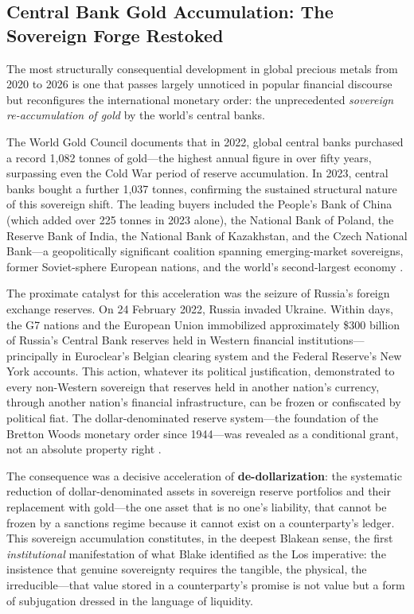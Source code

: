 \documentclass[
]{article}
\begin{document}
\subsection{Central Bank Gold Accumulation: The Sovereign Forge
Restoked}\label{central-bank-gold-accumulation-the-sovereign-forge-restoked}

The most structurally consequential development in global precious
metals from 2020 to 2026 is one that passes largely unnoticed in popular
financial discourse but reconfigures the international monetary order:
the unprecedented \emph{sovereign re-accumulation of gold} by the
world's central banks.

The World Gold Council documents that in 2022, global central banks
purchased a record 1,082 tonnes of gold---the highest annual figure in
over fifty years, surpassing even the Cold War period of reserve
accumulation. In 2023, central banks bought a further 1,037 tonnes,
confirming the sustained structural nature of this sovereign shift. The
leading buyers included the People's Bank of China (which added over 225
tonnes in 2023 alone), the National Bank of Poland, the Reserve Bank of
India, the National Bank of Kazakhstan, and the Czech National Bank---a
geopolitically significant coalition spanning emerging-market
sovereigns, former Soviet-sphere European nations, and the world's
second-largest economy \citep{worldgoldcouncil2024demand}.

The proximate catalyst for this acceleration was the seizure of Russia's
foreign exchange reserves. On 24 February 2022, Russia invaded Ukraine.
Within days, the G7 nations and the European Union immobilized
approximately \$300 billion of Russia's Central Bank reserves held in
Western financial institutions---principally in Euroclear's Belgian
clearing system and the Federal Reserve's New York accounts. This
action, whatever its political justification, demonstrated to every
non-Western sovereign that reserves held in another nation's currency,
through another nation's financial infrastructure, can be frozen or
confiscated by political fiat. The dollar-denominated reserve
system---the foundation of the Bretton Woods monetary order since
1944---was revealed as a conditional grant, not an absolute property
right \citep{eichengreen2022sanctions}.

The consequence was a decisive acceleration of
\textbf{de-dollarization}: the systematic reduction of
dollar-denominated assets in sovereign reserve portfolios and their
replacement with gold---the one asset that is no one's liability, that
cannot be frozen by a sanctions regime because it cannot exist on a
counterparty's ledger. This sovereign accumulation constitutes, in the
deepest Blakean sense, the first \emph{institutional} manifestation of
what Blake identified as the Los imperative: the insistence that genuine
sovereignty requires the tangible, the physical, the irreducible---that
value stored in a counterparty's promise is not value but a form of
subjugation dressed in the language of liquidity.
\end{document}
